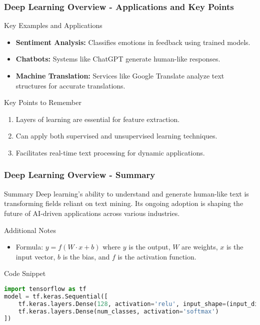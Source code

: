 \documentclass[aspectratio=169]{beamer}
\begin{document}
\begin{frame}[fragile]
    \frametitle{Deep Learning Overview - Applications and Key Points}
    \begin{block}{Key Examples and Applications}
        \begin{itemize}
            \item \textbf{Sentiment Analysis:} Classifies emotions in feedback using trained models.
            \item \textbf{Chatbots:} Systems like ChatGPT generate human-like responses.
            \item \textbf{Machine Translation:} Services like Google Translate analyze text structures for accurate translations.
        \end{itemize}
    \end{block}

    \begin{block}{Key Points to Remember}
        \begin{enumerate}
            \item Layers of learning are essential for feature extraction.
            \item Can apply both supervised and unsupervised learning techniques.
            \item Facilitates real-time text processing for dynamic applications.
        \end{enumerate}
    \end{block}
\end{frame}

\begin{frame}[fragile]
    \frametitle{Deep Learning Overview - Summary}
    \begin{block}{Summary}
        Deep learning's ability to understand and generate human-like text is transforming fields reliant on text mining. Its ongoing adoption is shaping the future of AI-driven applications across various industries.
    \end{block}
    
    \begin{block}{Additional Notes}
        \begin{itemize}
            \item Formula: $\displaystyle y = f(W \cdot x + b)$ where $y$ is the output, $W$ are weights, $x$ is the input vector, $b$ is the bias, and $f$ is the activation function.
        \end{itemize}
    \end{block}
    
    \begin{block}{Code Snippet}
    \begin{lstlisting}[language=Python]
import tensorflow as tf
model = tf.keras.Sequential([
    tf.keras.layers.Dense(128, activation='relu', input_shape=(input_dim,)),
    tf.keras.layers.Dense(num_classes, activation='softmax')
])
    \end{lstlisting}
    \end{block}
\end{frame}
\end{document}

